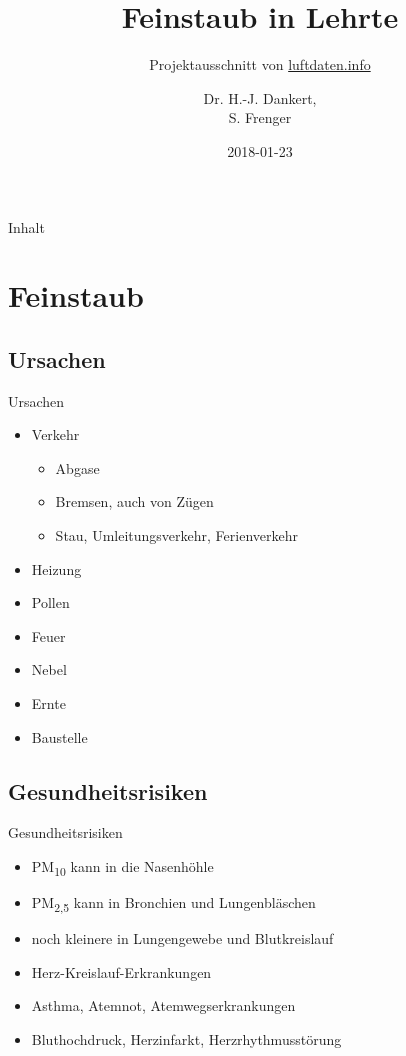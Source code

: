 \documentclass[aspectratio=169]{beamer} %
\begin{document}
\title{Feinstaub in Lehrte}
\subtitle{Projektausschnitt von \href{http://www.luftdaten.info}{luftdaten.info}}
\author{Dr. H.-J. Dankert,\\S. Frenger}
\date{2018-01-23} 

\frame{\titlepage} 

\begin{frame}{Inhalt}
  \begin{multicols}{2}
    \tableofcontents
  \end{multicols}
\end{frame}

\section{Feinstaub}

\subsection{Ursachen}
\begin{frame}{Ursachen}
  \begin{itemize}
  \item Verkehr
    \begin{itemize}
    \item Abgase
    \item Bremsen, auch von Zügen
    \item Stau, Umleitungsverkehr, Ferienverkehr
    \end{itemize}
  \item Heizung
  \item Pollen
  \item Feuer
  \item Nebel
  \item Ernte
  \item Baustelle
  \end{itemize}
\end{frame}

\subsection{Gesundheitsrisiken}
\begin{frame}{Gesundheitsrisiken}
  \begin{itemize}
  \item PM\textsubscript{10} kann in die Nasenhöhle
  \item PM\textsubscript{2,5} kann in Bronchien und Lungenbläschen
  \item noch kleinere in Lungengewebe und Blutkreislauf
  \item Herz-Kreislauf-Erkrankungen
  \item Asthma, Atemnot, Atemwegserkrankungen
  \item Bluthochdruck, Herzinfarkt, Herzrhythmusstörung
  \end{itemize}
\end{frame}
\end{document}
